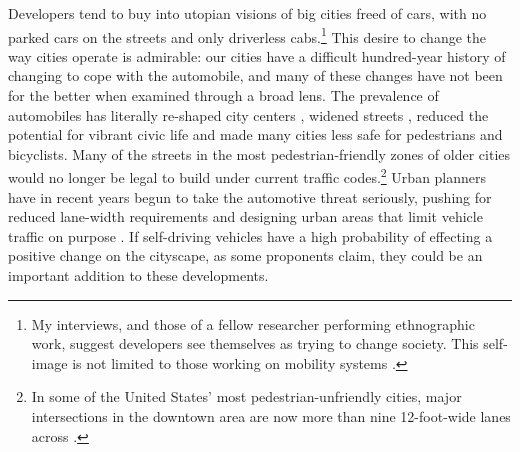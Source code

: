 

Developers tend to buy into utopian visions of big cities freed of cars, with no
parked cars on the streets and only driverless cabs.\footnote{My
  interviews, and those of a fellow
researcher performing ethnographic work, suggest developers see
themselves as trying to change society. This self-image is not limited
to those working on mobility systems \cite{naughtonTech}.} This desire to
change the way cities operate is admirable: our cities have a
difficult hundred-year history of changing to cope with the
automobile, and many of these changes have not been for the better
when examined through a broad lens. The prevalence of automobiles has
literally re-shaped city centers \cite[p. 7]{burdenCities}, widened
streets \cite[p. 10]{burdenCities} \cite[p. 65]{fernandezBoulder},
reduced the potential for vibrant civic life \cite[p. 60]{miaraBoston}
and made many cities less safe for 
pedestrians and bicyclists. Many of the streets in the most
pedestrian-friendly zones of older cities would no longer be legal to
build under 
current traffic codes.\footnote{In some of the
United States' most pedestrian-unfriendly cities, major intersections
in the downtown area are now more than nine 12-foot-wide lanes across
\cite{citylab}.} Urban planners have
in recent years begun to take the automotive threat seriously, pushing
for reduced lane-width requirements and designing urban areas that
limit vehicle traffic on purpose \cite[p. 67]{fernandezBoulder}. If self-driving
vehicles have a high probability of effecting a positive change on the
cityscape, as some proponents claim, they could be an important
addition to these developments.

